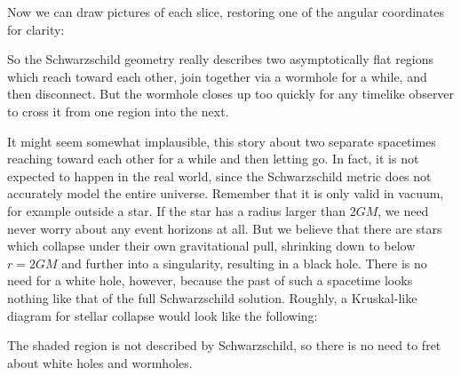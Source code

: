 \noindent Now we can draw pictures of each slice, restoring one of 
the angular coordinates for clarity:

\begin{figure}[h]
  \centerline{
  }
\end{figure}

\noindent
So the Schwarzschild geometry really describes two asymptotically
flat regions which reach toward each other, join together via a
wormhole for a while, and then disconnect.  But the wormhole
closes up too quickly for any timelike observer to cross it from one
region into the next.

It might seem somewhat implausible, this story about two separate
spacetimes reaching toward each other for a while and then letting
go.  In fact, it is not expected to happen in the real world, since
the Schwarzschild metric does not accurately model the entire 
universe.  Remember that it is only valid in vacuum, for example
outside a star.  If the star has a radius larger than $2GM$, we
need never worry about any event horizons at all.  But we believe
that there are stars which collapse under their own gravitational
pull, shrinking down to below $r=2GM$ and further into a singularity,
resulting in a black hole.  There is no need for a white hole, however,
because the past of such a spacetime looks nothing like that of the
full Schwarzschild solution.  Roughly, a Kruskal-like diagram for
stellar collapse would look like the following:

\begin{figure}[h]
  \centerline{
  }
\end{figure}

\noindent  The shaded region is not described by Schwarzschild, so
there is no need to fret about white holes and wormholes. 


